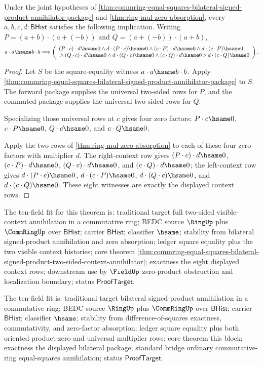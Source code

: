 \begin{theorem}
\label{thm:commring-equal-squares-bilateral-signed-product-two-sided-context-annihilator}
Under the joint hypotheses of
\autoref{thm:commring-equal-squares-bilateral-signed-product-annihilator-package}
and \autoref{thm:ring-mul-zero-absorption}, every
$a,b,c,d : \mathsf{BHist}$ satisfies the following implication. Writing
$P=(a+b)\cdot(a+(-b))$ and $Q=(a+(-b))\cdot(a+b)$,
$$
a\cdot a\hsame b\cdot b
\Longrightarrow
\left(
\begin{array}{l}
(P\cdot c)\cdot d\hsame0
\land
d\cdot(P\cdot c)\hsame0
\land
(c\cdot P)\cdot d\hsame0
\land
d\cdot(c\cdot P)\hsame0
\\
{}\land
(Q\cdot c)\cdot d\hsame0
\land
d\cdot(Q\cdot c)\hsame0
\land
(c\cdot Q)\cdot d\hsame0
\land
d\cdot(c\cdot Q)\hsame0
\end{array}
\right).
$$
\end{theorem}
\begin{proof}
Let $S$ be the square-equality witness $a\cdot a\hsame b\cdot b$. Apply
\autoref{thm:commring-equal-squares-bilateral-signed-product-annihilator-package}
to $S$. The forward package supplies the universal two-sided rows for $P$,
and the commuted package supplies the universal two-sided rows for $Q$.

Specializing those universal rows at $c$ gives four zero factors:
$P\cdot c\hsame0$, $c\cdot P\hsame0$, $Q\cdot c\hsame0$, and
$c\cdot Q\hsame0$.

Apply the two rows of \autoref{thm:ring-mul-zero-absorption} to each of these
four zero factors with multiplier $d$. The right-context row gives
$(P\cdot c)\cdot d\hsame0$, $(c\cdot P)\cdot d\hsame0$,
$(Q\cdot c)\cdot d\hsame0$, and $(c\cdot Q)\cdot d\hsame0$; the
left-context row gives $d\cdot(P\cdot c)\hsame0$, $d\cdot(c\cdot P)\hsame0$,
$d\cdot(Q\cdot c)\hsame0$, and $d\cdot(c\cdot Q)\hsame0$. These eight
witnesses are exactly the displayed context rows.
\end{proof}

The ten-field fit for this theorem is: traditional target full two-sided
visible-context annihilation in a commutative ring; BEDC source $\RingUp$ plus
$\CommRingUp$ over $\mathsf{BHist}$; carrier $\mathsf{BHist}$; classifier
$\hsame$; stability from bilateral signed-product annihilation and zero
absorption; ledger square equality plus the two visible context histories;
core theorem
\autoref{thm:commring-equal-squares-bilateral-signed-product-two-sided-context-annihilator};
exactness the eight displayed context rows; downstream use by $\FieldUp$
zero-product obstruction and localization boundary; status
$\mathsf{ProofTarget}$.

The ten-field fit is: traditional target bilateral signed-product
annihilation in a commutative ring; BEDC source $\RingUp$ plus $\CommRingUp$
over $\mathsf{BHist}$; carrier $\mathsf{BHist}$; classifier $\hsame$;
stability from difference-of-squares exactness, commutativity, and zero-factor
absorption; ledger square equality plus both oriented product-zero and
universal multiplier rows; core theorem this block; exactness the displayed
bilateral package; standard bridge ordinary commutative-ring equal-squares
annihilation; status $\mathsf{ProofTarget}$.

